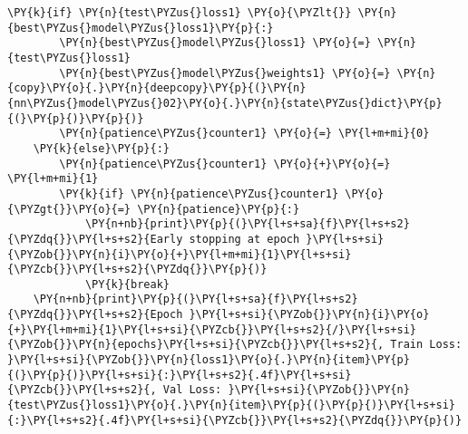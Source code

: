 \begin{tcolorbox}[breakable, size=fbox, boxrule=1pt, pad at break*=1mm,colback=cellbackground, colframe=cellborder]
\begin{Verbatim}[commandchars=\\\{\}]
    \PY{k}{if} \PY{n}{test\PYZus{}loss1} \PY{o}{\PYZlt{}} \PY{n}{best\PYZus{}model\PYZus{}loss1}\PY{p}{:}
        \PY{n}{best\PYZus{}model\PYZus{}loss1} \PY{o}{=} \PY{n}{test\PYZus{}loss1}
        \PY{n}{best\PYZus{}model\PYZus{}weights1} \PY{o}{=} \PY{n}{copy}\PY{o}{.}\PY{n}{deepcopy}\PY{p}{(}\PY{n}{nn\PYZus{}model\PYZus{}02}\PY{o}{.}\PY{n}{state\PYZus{}dict}\PY{p}{(}\PY{p}{)}\PY{p}{)}
        \PY{n}{patience\PYZus{}counter1} \PY{o}{=} \PY{l+m+mi}{0}
    \PY{k}{else}\PY{p}{:}
        \PY{n}{patience\PYZus{}counter1} \PY{o}{+}\PY{o}{=} \PY{l+m+mi}{1}
        \PY{k}{if} \PY{n}{patience\PYZus{}counter1} \PY{o}{\PYZgt{}}\PY{o}{=} \PY{n}{patience}\PY{p}{:}
            \PY{n+nb}{print}\PY{p}{(}\PY{l+s+sa}{f}\PY{l+s+s2}{\PYZdq{}}\PY{l+s+s2}{Early stopping at epoch }\PY{l+s+si}{\PYZob{}}\PY{n}{i}\PY{o}{+}\PY{l+m+mi}{1}\PY{l+s+si}{\PYZcb{}}\PY{l+s+s2}{\PYZdq{}}\PY{p}{)}
            \PY{k}{break}
    \PY{n+nb}{print}\PY{p}{(}\PY{l+s+sa}{f}\PY{l+s+s2}{\PYZdq{}}\PY{l+s+s2}{Epoch }\PY{l+s+si}{\PYZob{}}\PY{n}{i}\PY{o}{+}\PY{l+m+mi}{1}\PY{l+s+si}{\PYZcb{}}\PY{l+s+s2}{/}\PY{l+s+si}{\PYZob{}}\PY{n}{epochs}\PY{l+s+si}{\PYZcb{}}\PY{l+s+s2}{, Train Loss: }\PY{l+s+si}{\PYZob{}}\PY{n}{loss1}\PY{o}{.}\PY{n}{item}\PY{p}{(}\PY{p}{)}\PY{l+s+si}{:}\PY{l+s+s2}{.4f}\PY{l+s+si}{\PYZcb{}}\PY{l+s+s2}{, Val Loss: }\PY{l+s+si}{\PYZob{}}\PY{n}{test\PYZus{}loss1}\PY{o}{.}\PY{n}{item}\PY{p}{(}\PY{p}{)}\PY{l+s+si}{:}\PY{l+s+s2}{.4f}\PY{l+s+si}{\PYZcb{}}\PY{l+s+s2}{\PYZdq{}}\PY{p}{)}
\end{Verbatim}
\end{tcolorbox}

